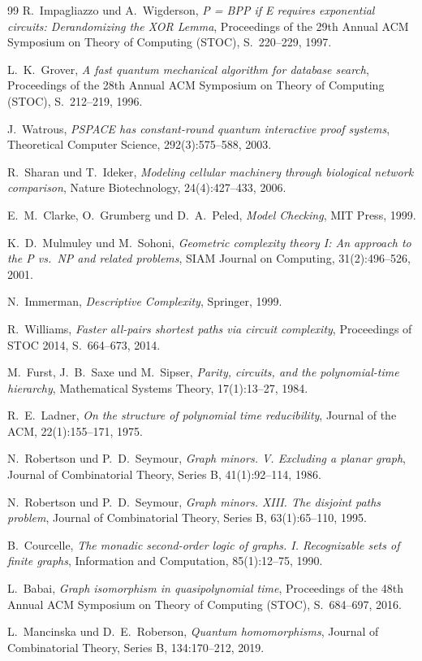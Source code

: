 ﻿\documentclass[a4paper,12pt]{article}
\theoremstyle{definition}
\begin{document}
\begin{thebibliography}{99}
  R.~Impagliazzo und A.~Wigderson,
  \textit{P = BPP if E requires exponential circuits: Derandomizing the XOR Lemma},
  Proceedings of the 29th Annual ACM Symposium on Theory of Computing (STOC),
  S.~220--229, 1997.

  L.~K.~Grover,
  \textit{A fast quantum mechanical algorithm for database search},
  Proceedings of the 28th Annual ACM Symposium on Theory of Computing (STOC),
  S.~212--219, 1996.

  J.~Watrous,
  \textit{PSPACE has constant-round quantum interactive proof systems},
  Theoretical Computer Science, 292(3):575--588, 2003.

  R.~Sharan und T.~Ideker,
  \textit{Modeling cellular machinery through biological network comparison},
  Nature Biotechnology, 24(4):427--433, 2006.

  E.~M.~Clarke, O.~Grumberg und D.~A.~Peled,
  \textit{Model Checking},
  MIT Press, 1999.

  K.~D.~Mulmuley und M.~Sohoni,
  \textit{Geometric complexity theory I: An approach to the P vs.\ NP
          and related problems},
  SIAM Journal on Computing, 31(2):496--526, 2001.

  N.~Immerman,
  \textit{Descriptive Complexity},
  Springer, 1999.

  R.~Williams,
  \textit{Faster all-pairs shortest paths via circuit complexity},
  Proceedings of STOC 2014, S.~664--673, 2014.

  M.~Furst, J.~B.~Saxe und M.~Sipser,
  \textit{Parity, circuits, and the polynomial-time hierarchy},
  Mathematical Systems Theory, 17(1):13--27, 1984.

  R.~E.~Ladner,
  \textit{On the structure of polynomial time reducibility},
  Journal of the ACM, 22(1):155--171, 1975.

  N.~Robertson und P.~D.~Seymour,
  \textit{Graph minors. V. Excluding a planar graph},
  Journal of Combinatorial Theory, Series B, 41(1):92--114, 1986.

  N.~Robertson und P.~D.~Seymour,
  \textit{Graph minors. XIII. The disjoint paths problem},
  Journal of Combinatorial Theory, Series B, 63(1):65--110, 1995.

  B.~Courcelle,
  \textit{The monadic second-order logic of graphs. I. Recognizable sets of finite graphs},
  Information and Computation, 85(1):12--75, 1990.

  L.~Babai,
  \textit{Graph isomorphism in quasipolynomial time},
  Proceedings of the 48th Annual ACM Symposium on Theory of Computing (STOC),
  S.~684--697, 2016.

  L.~Mancinska und D.~E.~Roberson,
  \textit{Quantum homomorphisms},
  Journal of Combinatorial Theory, Series B, 134:170--212, 2019.

\end{thebibliography}
\end{document}
